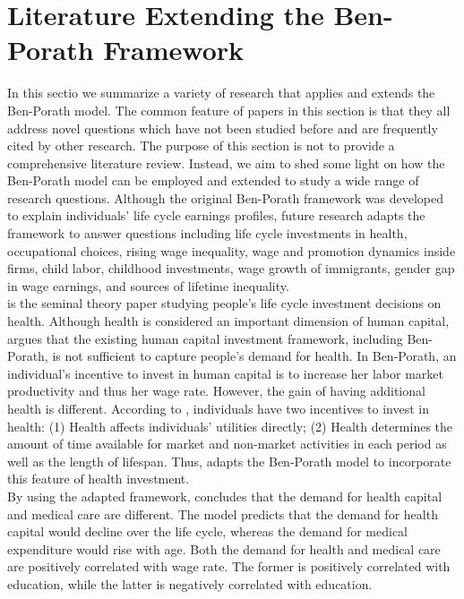 \section{Literature Extending the Ben-Porath Framework}

\noindent In this sectio we summarize a variety of research that applies and extends the Ben-Porath model. The common feature of papers in this section is that they all address novel questions which have not been studied before and are frequently cited by other research. The purpose of this section is not to provide a comprehensive literature review. Instead, we aim to shed some light on how the Ben-Porath model can be employed and extended to study a wide range of research questions. Although the original Ben-Porath framework was developed to explain individuals' life cycle earnings profiles, future research adapts the framework to answer questions including life cycle investments in health, occupational choices, rising wage inequality, wage and promotion dynamics inside firms, child labor, childhood investments, wage growth of immigrants, gender gap in wage earnings, and sources of lifetime inequality. \\
\indent \citet{grossman1972concept} is the seminal theory paper studying people's life cycle investment decisions on health. Although health is considered an important dimension of human capital, \citet{grossman1972concept} argues that the existing human capital investment framework, including Ben-Porath, is not sufficient to capture people's demand for health. In Ben-Porath, an individual's incentive to invest in human capital is to increase her labor market productivity and thus her wage rate. However, the gain of having additional health is different. According to \citet{grossman1972concept}, individuals have two incentives to invest in health: (1) Health affects individuals' utilities directly; (2) Health determines the amount of time available for market and non-market activities in each period as well as the length of lifespan. Thus, \citet{grossman1972concept} adapts the Ben-Porath model to incorporate this feature of health investment.\\
\indent By using the adapted framework, \citet{grossman1972concept}  concludes that the demand for health capital and medical care are different. The model predicts that the demand for health capital would decline over the life cycle, whereas the demand for medical expenditure would rise with age. Both the demand for health and medical care are positively correlated with wage rate. The former is positively correlated with education, while the latter is negatively correlated with education.\\
